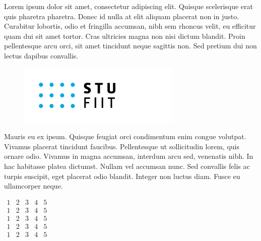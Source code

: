 \documentclass[10pt,twocolumn,twoside,slovak,a4paper]{article}
\begin{document}
\clearpage
\clearpage


Lorem ipsum dolor sit amet, consectetur adipiscing elit. Quisque scelerisque erat quis pharetra pharetra. Donec id nulla at elit aliquam placerat non in justo. Curabitur lobortis, odio et fringilla accumsan, nibh sem rhoncus velit, eu efficitur quam dui sit amet tortor. Cras ultricies magna non nisi dictum blandit. Proin pellentesque arcu orci, sit amet tincidunt neque sagittis non. Sed pretium dui non lectus dapibus convallis.
\begin{figure}
    \includegraphics[width=\linewidth]{STU-FIIT-zfv.png}
\end{figure}
Mauris eu ex ipsum. Quisque feugiat orci condimentum enim congue volutpat. Vivamus placerat tincidunt faucibus. Pellentesque ut sollicitudin lorem, quis ornare odio. Vivamus in magna accumsan, interdum arcu sed, venenatis nibh. In hac habitasse platea dictumst. Nullam vel accumsan nunc. Sed convallis felis ac turpis suscipit, eget placerat odio blandit. Integer non luctus diam. Fusce eu ullamcorper neque.

\clearpage

$\begin{matrix}
1 & 2 & 3 & 4 & 5\\
1 & 2 & 3 & 4 & 5\\
1 & 2 & 3 & 4 & 5\\
1 & 2 & 3 & 4 & 5\\
1 & 2 & 3 & 4 & 5
\end{matrix}$
\end{document}
